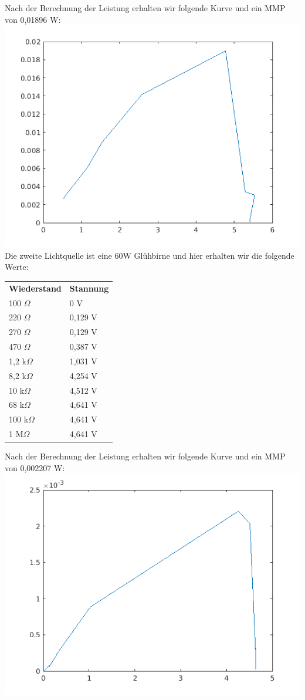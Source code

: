 \documentclass[a4paper,12pt]{article}
\begin{document}
Nach der Berechnung der Leistung erhalten wir folgende Kurve und ein MMP von 0,01896 W:\newline
\includegraphics{200WGB}
\newline \newline
Die zweite Lichtquelle ist eine 60W Glühbirne und hier erhalten wir die folgende Werte:\newline
 \begin{tabular}{ll}
  \textbf{Wiederstand} & \textbf{Stannung} \\
  100 $ \Omega $ & 0 V\\
  220 $ \Omega $ & 0,129 V\\
  270 $ \Omega $ & 0,129 V\\
  470 $ \Omega $ & 0,387 V\\
  1,2 k$ \Omega $ & 1,031 V\\
  8,2 k$ \Omega $ & 4,254 V \\
  10 k$ \Omega $ & 4,512 V \\
  68 k$ \Omega $ & 4,641 V \\
  100 k$ \Omega $ & 4,641 V \\
  1 M$ \Omega $ & 4,641 V \\
 \end{tabular}
Nach der Berechnung der Leistung erhalten wir folgende Kurve und ein MMP von 0,002207 W:\newline
\includegraphics{60WGB}
\end{document}
